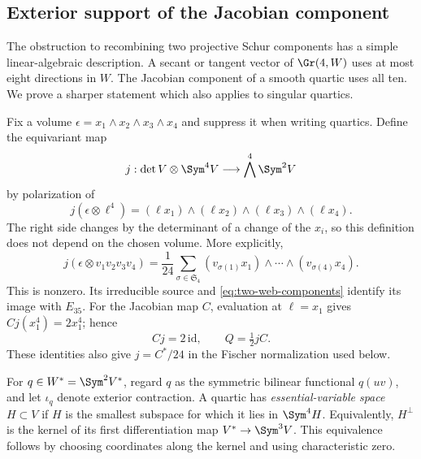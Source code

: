 \subsection{Exterior support of the Jacobian component}
\label{sec:schur-support}

The obstruction to recombining two projective Schur components has a
simple linear-algebraic description.  A secant or tangent vector of
\(\Gr(4,W)\) uses at most eight directions in \(W\).  The
Jacobian component of a smooth quartic uses all ten.  We prove a
sharper statement which also applies to singular quartics.

Fix a volume \(\epsilon=x_1\wedge x_2\wedge x_3\wedge x_4\)
and suppress it when writing quartics.  Define the equivariant map
\[
 j:\det V\otimes\Sym^4V\longrightarrow\bigwedge^4\Sym^2V
\]
by polarization of
\begin{equation}\label{eq:polarized-schur-embedding}
 j(\epsilon\otimes\ell^4)
       =(\ell x_1)\wedge(\ell x_2)\wedge(\ell x_3)\wedge(\ell x_4).
\end{equation}
The right side changes by the determinant of a change of the
\(x_i\), so this definition does not depend on the chosen volume.
More explicitly,
\begin{equation}\label{eq:schur-polarization-formula}
 j(\epsilon\otimes v_1v_2v_3v_4)
 =\frac1{24}\sum_{\sigma\in\mathfrak S_4}
       (v_{\sigma(1)}x_1)\wedge\cdots\wedge(v_{\sigma(4)}x_4).
\end{equation}
This is nonzero.  Its irreducible source and
\eqref{eq:two-web-components} identify its image with \(E_{35}\).
For the Jacobian map \(C\), evaluation at \(\ell=x_1\) gives
\(Cj(x_1^4)=2x_1^4\); hence
\begin{equation}\label{eq:jacobian-schur-normalization}
 Cj=2\,\mathrm{id},\qquad Q=\tfrac12jC.
\end{equation}
These identities also give \(j=C^*/24\) in the Fischer
normalization used below.

For \(q\in W^*=\Sym^2V^*\), regard \(q\) as the symmetric
bilinear functional \(q(uv)\), and let \(\iota_q\) denote
exterior contraction.  A quartic has \emph{essential-variable
space} \(H\subset V\) if \(H\) is the smallest subspace for
which it lies in \(\Sym^4H\).  Equivalently,
\(H^\perp\) is the kernel of its first differentiation map
\(V^*\to\Sym^3V\).  This equivalence follows by choosing
coordinates along the kernel and using characteristic zero.

